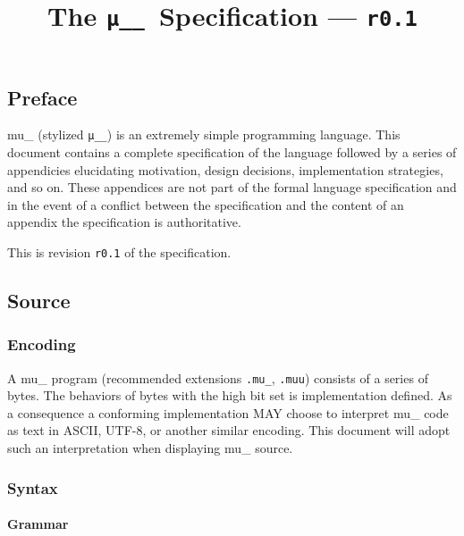 \documentclass[twocolumn]{report}
\newcommand\muu{\texttt{μ\!\!\!\_\_}}
\newcommand\rev{\texttt{r0.1} }
\begin{document}
\title{The \muu\ Specification --- \rev}

\makeatletter\chapter*{\@title}\makeatother
\label{ch:main}

\section*{Preface}
\label{sec:preface}

mu\_ (stylized \muu) is an extremely simple programming language.
This document contains a complete specification of the language followed by a series of appendicies elucidating motivation, design decisions, implementation strategies, and so on.
These appendices are not part of the formal language specification and in the event of a conflict between the specification and the content of an appendix the specification is authoritative.

This is revision \rev of the specification.

\section{Source}
\label{sec:source}

\subsection{Encoding}
\label{subsec:encoding}

A mu\_ program (recommended extensions \texttt{.mu\_}, \texttt{.muu}) consists of a series of bytes.
The behaviors of bytes with the high bit set is implementation defined.
As a consequence a conforming implementation MAY choose to interpret mu\_ code as text in ASCII, UTF-8, or another similar encoding.
This document will adopt such an interpretation when displaying mu\_ source.

\subsection{Syntax}
\label{subsec:syntax}

\subsubsection{Grammar}
\label{subsubsec:grammar}
\end{document}
